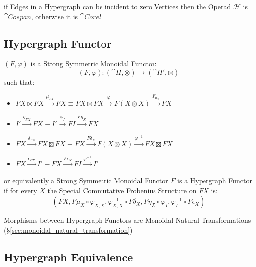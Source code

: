 if Edges in a Hypergraph can be incident to zero Vertices then the
Operad $\mathcal{H}$ is $\cat{Cospan}$, otherwise it is $\cat{Corel}$




\subsection{Hypergraph Functor}\label{sec:hypergraph_functor}

$(F,\varphi)$ is a Strong Symmetric Monoidal Functor:
\[
  (F,\varphi) : (\cat{H},\otimes) \rightarrow (\cat{H}',\boxtimes)
\]
such that:
\begin{itemize}
  \item $FX \boxtimes FX \xrightarrow{\mu_{FX}} FX
    \equiv FX \boxtimes FX \xrightarrow{\varphi} F(X \otimes X)
      \xrightarrow{F_{\mu_X}} FX$
  \item $I' \xrightarrow{\eta_{FX}} FX
    \equiv I' \xrightarrow{\varphi_I} FI \xrightarrow{F \eta_X} FX$
  \item $FX \xrightarrow{\delta_{FX}} FX \boxtimes FX
    \equiv FX \xrightarrow{F\delta_X} F(X \otimes X)
      \xrightarrow{\varphi^{-1}} FX \boxtimes FX$
  \item $FX \xrightarrow{\epsilon_{FX}} I'
    \equiv FX \xrightarrow{F \epsilon_X} FI
      \xrightarrow{\varphi^{-1}} I'$
\end{itemize} %
or equivalently a Strong Symmetric Monoidal Functor $F$ is a
Hypergraph Functor if for every $X$ the Special Commutative Frobenius
Structure on $FX$ is:
\[
  (FX, F\mu_X \circ \varphi_{X,X}, \varphi^{-1}_{X,X} \circ F\delta_X,
    F\eta_X \circ \varphi_I, \varphi^{-1}_I \circ F\epsilon_X)
\]

Morphisms between Hypergraph Functors are Monoidal Natural
Transformations (\S\ref{sec:monoidal_natural_transformation})



\subsection{Hypergraph Equivalence}\label{sec:hypergraph_equivalence}

